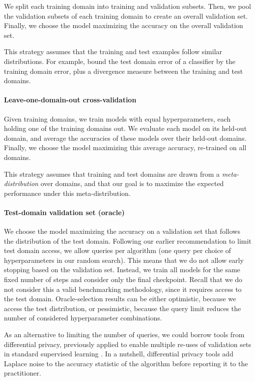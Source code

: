 \documentclass{article}
\begin{document}
We split each training domain into training and validation subsets.
Then, we pool the validation subsets of each training domain to create an overall validation set.
Finally, we choose the model maximizing the accuracy on the overall validation set.

This strategy assumes that the training and test examples follow similar distributions.
For example, \citet{ben2010theory} bound the test domain error of a classifier by the training domain error, plus a divergence measure between the training and test domains.


\paragraph{Leave-one-domain-out cross-validation}

Given  training domains, we train  models with equal hyperparameters, each holding one of the training domains out.
We evaluate each model on its held-out domain, and average the accuracies of these models over their held-out domains.
Finally, we choose the model maximizing this average accuracy, re-trained on all  domains.

This strategy assumes that training and test domains are drawn from a \emph{meta-distribution} over domains, and that our goal is to maximize the expected performance under this meta-distribution.

\paragraph{Test-domain validation set (oracle)}

We choose the model maximizing the accuracy on a validation set that follows the distribution of the test domain.
Following our earlier recommendation to limit test domain access, we allow  queries per algorithm (one query per choice of hyperparameters in our random search).
This means that we do not allow early stopping based on the validation set.
Instead, we train all models for the same fixed number of steps and consider only the final checkpoint.
Recall that we do not consider this a valid benchmarking methodology, since it requires access to the test domain.
Oracle-selection results can be either optimistic, because we access the test distribution, or pessimistic, because the query limit reduces the number of considered hyperparameter combinations.

As an alternative to limiting the number of queries, we could borrow tools from differential privacy, previously applied to enable multiple re-uses of validation sets in standard supervised learning \citep{dwork2015reusable}. 
In a nutshell, differential privacy tools add Laplace noise to the accuracy statistic of the algorithm before reporting it to the practitioner.
\end{document}
